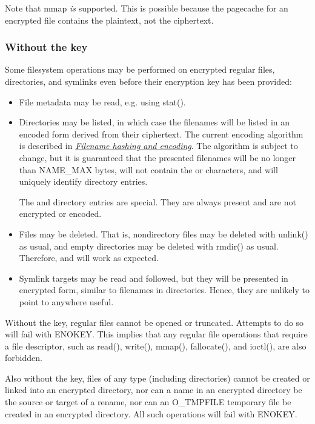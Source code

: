 \documentclass[a4paper,8pt,english]{sphinxmanual}
\begin{document}
Note that mmap \emph{is} supported.  This is possible because the pagecache
for an encrypted file contains the plaintext, not the ciphertext.


\subsubsection{Without the key}
\label{filesystems/fscrypt:without-the-key}
Some filesystem operations may be performed on encrypted regular
files, directories, and symlinks even before their encryption key has
been provided:
\begin{itemize}
\item {} 
File metadata may be read, e.g. using stat().

\item {} 
Directories may be listed, in which case the filenames will be
listed in an encoded form derived from their ciphertext.  The
current encoding algorithm is described in {\hyperref[filesystems/fscrypt:filename\string-hashing\string-and\string-encoding]{\emph{Filename hashing and
encoding}}}.  The algorithm is subject to change, but it is
guaranteed that the presented filenames will be no longer than
NAME\_MAX bytes, will not contain the \code{/} or  characters, and
will uniquely identify directory entries.

The  and  directory entries are special.  They are always
present and are not encrypted or encoded.

\item {} 
Files may be deleted.  That is, nondirectory files may be deleted
with unlink() as usual, and empty directories may be deleted with
rmdir() as usual.  Therefore,  and  will work as
expected.

\item {} 
Symlink targets may be read and followed, but they will be presented
in encrypted form, similar to filenames in directories.  Hence, they
are unlikely to point to anywhere useful.

\end{itemize}

Without the key, regular files cannot be opened or truncated.
Attempts to do so will fail with ENOKEY.  This implies that any
regular file operations that require a file descriptor, such as
read(), write(), mmap(), fallocate(), and ioctl(), are also forbidden.

Also without the key, files of any type (including directories) cannot
be created or linked into an encrypted directory, nor can a name in an
encrypted directory be the source or target of a rename, nor can an
O\_TMPFILE temporary file be created in an encrypted directory.  All
such operations will fail with ENOKEY.
\end{document}
